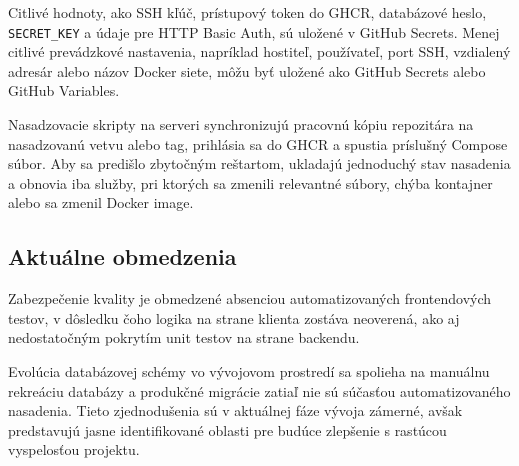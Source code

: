 Citlivé hodnoty, ako SSH kľúč, prístupový token do GHCR, databázové heslo, \texttt{SECRET\_KEY} a údaje pre HTTP Basic Auth, sú uložené v GitHub Secrets. Menej citlivé prevádzkové nastavenia, napríklad hostiteľ, používateľ, port SSH, vzdialený adresár alebo názov Docker siete, môžu byť uložené ako GitHub Secrets alebo GitHub Variables.

Nasadzovacie skripty na serveri synchronizujú pracovnú kópiu repozitára na nasadzovanú vetvu alebo tag, prihlásia sa do GHCR a spustia príslušný Compose súbor. Aby sa predišlo zbytočným reštartom, ukladajú jednoduchý stav nasadenia a obnovia iba služby, pri ktorých sa zmenili relevantné súbory, chýba kontajner alebo sa zmenil Docker image.


\subsection{Aktuálne obmedzenia}

Zabezpečenie kvality je obmedzené absenciou automatizovaných frontendových testov, v dôsledku čoho logika na strane klienta zostáva neoverená, ako aj nedostatočným pokrytím unit testov na strane backendu. 

Evolúcia databázovej schémy vo vývojovom prostredí sa spolieha na manuálnu rekreáciu databázy a produkčné migrácie zatiaľ nie sú súčasťou automatizovaného nasadenia. Tieto zjednodušenia sú v aktuálnej fáze vývoja zámerné, avšak predstavujú jasne identifikované oblasti pre budúce zlepšenie s rastúcou vyspelosťou projektu.


\clearpage

